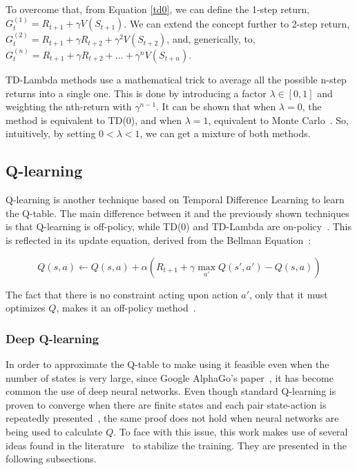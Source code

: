 \documentclass[11pt,twoside]{article}
\begin{document}
To overcome that, from Equation \ref{td0}, we can define the 1-step return, $G_t^{(1)} = R_{t+1} + \gamma V(S_{t+1})$. We can extend the concept further to 2-step return, $G_t^{(2)} = R_{t+1} + \gamma R_{t+2} + \gamma^2 V(S_{t+2})$, and, generically, to, $G_t^{(n)} = R_{t+1} + \gamma R_{t+2} + \ldots + \gamma^n V(S_{t+n})$. 

TD-Lambda methods use a mathematical trick to average all the possible n-step returns into a single one. This is done by introducing a factor $\lambda \in [0, 1]$ and weighting the nth-return with $\gamma^{n-1}$. It can be shown that when $\lambda = 0$, the method is equivalent to TD(0), and when $\lambda = 1$, equivalent to Monte Carlo~\cite{dp_approx}. So, intuitively, by setting $0 < \lambda < 1$, we can get a mixture of both methods.

\subsection{Q-learning}

Q-learning is another technique based on Temporal Difference Learning to learn the Q-table. The main difference between it and the previously shown techniques is that Q-learning is off-policy, while TD(0) and TD-Lambda are on-policy~\cite{sutton}. This is reflected in its update equation, derived from the Bellman Equation~\cite{qlearning}:

\begin{equation} \label{qlearning}
	Q(s, a) \leftarrow Q(s, a) + \alpha (R_{t+1} + \gamma \max_{a'} Q(s', a') - Q(s,a))
\end{equation}

The fact that there is no constraint acting upon action $a'$, only that it must optimizes $Q$, makes it an off-policy method~\cite{qlearning}.

\subsubsection{Deep Q-learning}

In order to approximate the Q-table to make using it feasible even when the number of states is very large, since Google AlphaGo's paper~\cite{alphago}, it has become common the use of deep neural networks. Even though standard Q-learning is proven to converge when there are finite states and each pair state-action is repeatedly presented~\cite{convergence_qlearning}, the same proof does not hold when neural networks are being used to calculate $Q$. To face with this issue, this work makes use of several ideas found in the literature~\cite{replay} to stabilize the training. They are presented in the following subsections.
\end{document}
